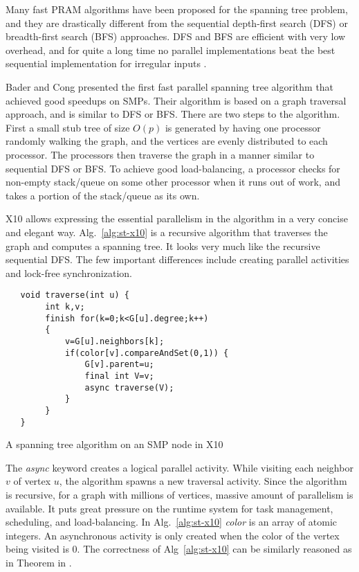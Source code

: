 Many fast PRAM algorithms have been proposed for the spanning tree problem, and they 
are drastically different from the sequential depth-first search (DFS) or breadth-first search (BFS) approaches.
DFS and BFS are efficient with very low overhead, and for quite a long time no parallel implementations beat the
best sequential implementation for irregular inputs \cite{BC04a}. 

Bader and Cong \cite{BC04a} presented the first fast parallel spanning tree algorithm that achieved good 
speedups on SMPs. Their algorithm is based on a graph traversal approach, and is similar to DFS or BFS. 
There are two steps to the algorithm. First a small stub tree of size $O(p)$ is generated by having one processor randomly walking the graph, and the vertices are evenly distributed to each processor.
The processors then traverse the graph in a manner similar to sequential DFS or BFS. 
To achieve good load-balancing, a processor checks for non-empty stack/queue on some other processor when it runs out of work, and takes a portion of the stack/queue as its own.

X10 allows expressing the essential parallelism in the algorithm in a very concise and elegant way. Alg.~\ref{alg:st-x10} is a recursive algorithm that traverses the graph and computes a spanning tree. It looks very much like the recursive sequential DFS. The few important differences include creating parallel activities and lock-free synchronization.  
\begin{algorithm}
\begin{verbatim} 
   void traverse(int u) {
        int k,v;
        finish for(k=0;k<G[u].degree;k++)
        {
            v=G[u].neighbors[k];
            if(color[v].compareAndSet(0,1)) {
                G[v].parent=u;
                final int V=v;
                async traverse(V);
            }
        }
   }
\end{verbatim}
\caption{A spanning tree algorithm on an SMP node in X10}
\label{alg:st-x10}
\end{algorithm}

The \emph{async} keyword creates a logical parallel activity. While visiting each neighbor $v$ of vertex $u$, the algorithm spawns a new traversal activity. Since the algorithm is recursive, for a graph with millions of vertices, massive amount of parallelism is available. It puts great pressure on the runtime system for task management, scheduling, and load-balancing. In Alg.~\ref{alg:st-x10} \emph{color} is an array of atomic integers. An asynchronous activity is only created when the color of the vertex being visited is 0. The correctness of Alg~\ref{alg:st-x10} can be similarly reasoned as in Theorem in \cite{BC04a}. 

